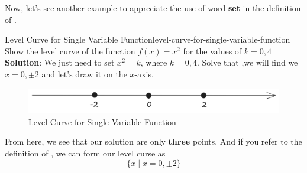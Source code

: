 \documentclass[math,code]{amznotes}
\theoremstyle{remark}
\begin{document}
Now, let's see another example to appreciate the use of word {\color{red} \textbf{set}} in the definition of .
\begin{exbox}{Level Curve for Single Variable Function}{level-curve-for-single-variable-function}
    Show the level curve of the function $f(x)=x^2$ for the values of $k=0, 4$ \newline
    {\color{blue} \textbf{Solution}}: We just need to set $x^2=k$, where $k=0, 4$. Solve that ,we will find we $x=0, \pm 2$ and let's draw it on the $x$-axis.
    \begin{figure}[H]
        \centering
        \includegraphics[width=0.75\linewidth]{images/level-curve-example-2.png}
        \caption{Level Curve for Single Variable Function}
        \label{fig:level-curve-for-single-variable-function}
    \end{figure}
    From here, we see that our solution are only \textbf{three} points. And if you refer to the definition of , we can form our level curse as
    \begin{displaymath}
        \{x \mid x=0,\pm 2\}
    \end{displaymath}
\end{exbox}
\end{document}

